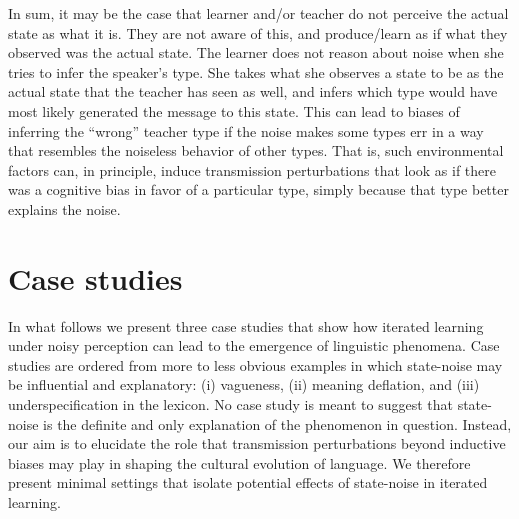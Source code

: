 \documentclass[10pt,a4paper]{article}
\newcommand{\citeposs}[2][]{\citeauthor{#2}'s (\citeyear[#1]{#2})}
\begin{document}
In sum, it may be the case that learner and/or teacher do not perceive the actual state as what
it is. They are not aware of this, and produce/learn as if what they observed was the actual
state. The learner does not reason about noise when she tries to infer the
speaker's type. She takes what she observes a state to be as the actual state that the teacher
has seen as well, and infers which type would have most likely generated the message to this
state. This can lead to biases of inferring the ``wrong'' teacher type if the noise makes some
types err in a way that resembles the noiseless behavior of other types. That is, such
environmental factors can, in principle, induce transmission perturbations that look as if there was a
cognitive bias in favor of a particular type, simply because that type better explains the
noise.


\section{Case studies}

In what follows we present three case studies that show how iterated learning under noisy
perception can lead to the emergence of linguistic phenomena. Case
studies are ordered from more to less obvious examples in which state-noise may be influential
and explanatory: (i) vagueness, (ii) meaning deflation, and (iii) underspecification in the
lexicon.
No case study is meant to suggest that state-noise is the definite and only explanation of the
phenomenon in question. Instead, our aim is to elucidate the role that transmission perturbations beyond
inductive biases may play in shaping the cultural evolution of language. We therefore present
minimal settings that isolate potential effects of state-noise in iterated learning.
\end{document}
